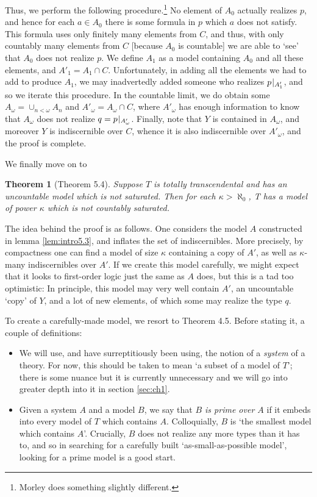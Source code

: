 \documentclass{article}
\newtheorem{theorem}{Theorem}[section]
\theoremstyle{nonumberplain}
\newcommand{\rst}[2]{#1\mspace{1.3mu plus 0.5mu minus 0.5mu}|_{#2}}
\begin{document}
Thus, we perform the following procedure.\footnote{Morley does something slightly different.} No element of $A_0$ actually realizes $p$, and hence for each $a \in A_0$ there is some formula in $p$ which $a$ does not satisfy. This formula uses only finitely many elements from $C$, and thus, with only countably many elements from $C$ [because $A_0$ is countable] we are able to `see' that $A_0$ does not realize $p$. We define $A_1$ as a model containing $A_0$ and all these elements, and $A'_1 = A_1 \cap C$. Unfortunately, in adding all the elements we had to add to produce $A_1$, we may inadvertedly added someone who realizes $\rst p{A'_1}$, and so we iterate this procedure. In the countable limit, we do obtain some $A_\omega = \cup_{n < \omega} A_n$ and $A'_\omega = A_\omega \cap C$, where $A'_\omega$ has enough information to know that $A_\omega$ does not realize $q = \rst p{A'_\omega}$. Finally, note that $Y$ is contained in $A_\omega$, and moreover $Y$ is indiscernible over $C$, whence it is also indiscernible over $A'_\omega$, and the proof is complete.

We finally move on to
\begin{theorem}[Theorem 5.4]\label{thm:intro5.4}
Suppose $T$ is totally transcendental and has an uncountable model which is not saturated. Then for each $\kappa > \aleph_0$, T has a model of power $\kappa$ which is not countably saturated.
\end{theorem}

The idea behind the proof is as follows. One considers the model $A$ constructed in lemma \ref{lem:intro5.3}, and inflates the set of indiscernibles. More precisely, by compactness one can find a model of size $\kappa$ containing a copy of $A'$, as well as $\kappa$-many indiscernibles over $A'$. If we create this model carefully, we might expect that it looks to first-order logic just the same as $A$ does, but this is a tad too optimistic: In principle, this model may very well contain $A'$, an uncountable `copy' of $Y$, and a lot of new elements, of which some may realize the type $q$.

To create a carefully-made model, we resort to Theorem 4.5. Before stating it, a couple of definitions:
\begin{itemize}
\item We will use, and have surreptitiously been using, the notion of a \emph{system} of a theory. For now, this should be taken to mean `a subset of a model of $T$'; there is some nuance but it is currently unnecessary and we will go into greater depth into it in section \ref{sec:ch1}.
\item Given a system $A$ and a model $B$, we say that \emph{$B$ is prime over $A$} if it embeds into every model of $T$ which contains $A$. Colloquially, $B$ is `the smallest model which contains $A$'. Crucially, $B$ does not realize any more types than it has to, and so in searching for a carefully built `as-small-as-possible model', looking for a prime model is a good start.
\end{itemize}
\end{document}
